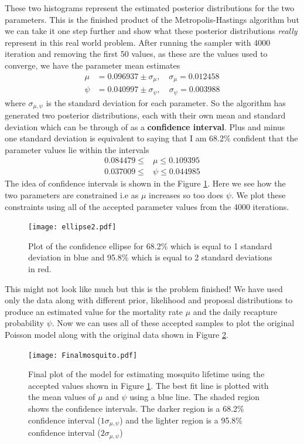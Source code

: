 \documentclass[12pt,twoside]{report}   %
\newcommand{\bb}{\textbf}
\newcommand{\ti}{\textit}
\begin{document}
These two histograms represent the estimated posterior distributions for the two parameters. This is the finished product of the Metropolis-Hastings algorithm but we can take it one step further and show what these posterior distributions \ti{really} represent in this real world problem. After running the sampler with 4000 iteration and removing the first 50 values, as these are the values used to converge, we have the parameter mean estimates
\begin{align*}
\mu &= 0.096937 \pm \sigma_\mu,\quad\sigma_\mu = 0.012458\\
\psi &= 0.040997 \pm \sigma_\psi,\quad\sigma_\psi = 0.003988
\end{align*}
where $\sigma_{\mu,\psi}$ is the standard deviation for each parameter. So the algorithm has generated two posterior distributions, each with their own mean and standard deviation which can be through of as a \bb{confidence interval}. Plus and minus one standard deviation is equivalent to saying that I am 68.2\% confident that the parameter values lie within the intervals
\begin{align*}
0.084479 \leq &\mu \leq 0.109395\\
0.037009 \leq &\psi \leq 0.044985
\end{align*}
The idea of confidence intervals is shown in the Figure \ref{fig1.9}. Here we see how the two parameters are constrained i.e as $\mu$ increases so too does $\psi$. We plot these constraints using all of the accepted parameter values from the 4000 iterations.
\begin{figure}[H]
\centering
\texttt{[image: ellipse2.pdf]}
\caption{Plot of the confidence ellipse for 68.2\% which is equal to 1 standard deviation in blue and 95.8\% which is equal to 2 standard deviations in red.}
\label{fig1.9}
\end{figure}

This might not look like much but this is the problem finished! We have used only the data along with different prior, likelihood and proposal distributions to produce an estimated value for the mortality rate $\mu$ and the daily recapture probability $\psi$. Now we can uses all of these accepted samples to plot the original Poisson model along with the original data shown in Figure \ref{fig1.10}.
\begin{figure}[H]
\centering
\texttt{[image: Finalmosquito.pdf]}
\caption{Final plot of the model for estimating mosquito lifetime using the accepted values shown in Figure \ref{fig1.9}. The best fit line is plotted with the mean values of $\mu$ and $\psi$ using a blue line. The shaded region shows the confidence intervals. The darker region is a 68.2\% confidence interval ($1\sigma_{\mu,\psi}$) and the lighter region is a 95.8\% confidence interval ($2\sigma_{\mu,\psi}$)}
\label{fig1.10}
\end{figure}
\end{document}
